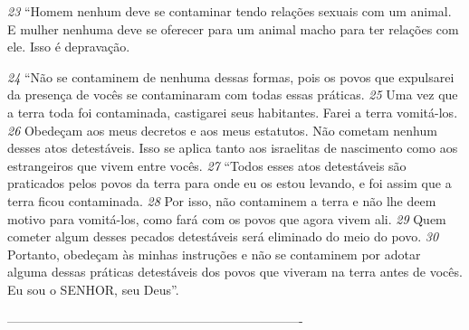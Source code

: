 \smallskip
\textit{\tiny 23}
“Homem nenhum deve se contaminar tendo relações sexuais com um
animal. E mulher nenhuma deve se oferecer para um animal macho para ter
relações com ele. Isso é depravação.
   
\smallskip
\textit{\tiny 24}
“Não se contaminem de nenhuma dessas formas, pois os povos que
expulsarei da presença de vocês se contaminaram com todas essas práticas.
\textit{\tiny 25}
Uma vez que a terra toda foi contaminada, castigarei seus habitantes. Farei a
terra vomitá-los. 
\textit{\tiny 26}
Obedeçam aos meus decretos e aos meus estatutos. Não
cometam nenhum desses atos detestáveis. Isso se aplica tanto aos israelitas de
nascimento como aos estrangeiros que vivem entre vocês.
\textit{\tiny 27}
“Todos esses atos detestáveis são praticados pelos povos da terra para onde
eu os estou levando, e foi assim que a terra ficou contaminada. 
\textit{\tiny 28}
Por isso, não
contaminem a terra e não lhe deem motivo para vomitá-los, como fará com os
povos que agora vivem ali. 
\textit{\tiny 29}
Quem cometer algum desses pecados detestáveis
será eliminado do meio do povo. 
\textit{\tiny 30}
Portanto, obedeçam às minhas instruções e
não se contaminem por adotar alguma dessas práticas detestáveis dos povos que
viveram na terra antes de vocês. Eu sou o SENHOR, seu Deus”.

----------------------------------------------------------------------
